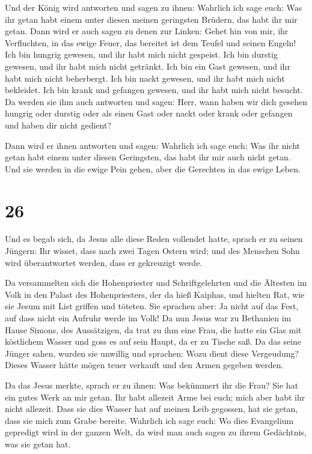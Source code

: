  Und der König wird antworten und sagen zu ihnen:
Wahrlich ich sage euch: Was ihr getan habt einem unter diesen meinen
geringsten Brüdern, das habt ihr mir getan.  Dann wird er
auch sagen zu denen zur Linken: Gehet hin von mir, ihr Verfluchten, in
das ewige Feuer, das bereitet ist dem Teufel und seinen Engeln!
 Ich bin hungrig gewesen, und ihr habt mich nicht
gespeist. Ich bin durstig gewesen, und ihr habt mich nicht getränkt.
 Ich bin ein Gast gewesen, und ihr habt mich nicht
beherbergt. Ich bin nackt gewesen, und ihr habt mich nicht bekleidet.
Ich bin krank und gefangen gewesen, und ihr habt mich nicht besucht.
 Da werden sie ihm auch antworten und sagen: Herr, wann
haben wir dich gesehen hungrig oder durstig oder als einen Gast oder
nackt oder krank oder gefangen und haben dir nicht gedient?

 Dann wird er ihnen antworten und sagen: Wahrlich ich
sage euch: Was ihr nicht getan habt einem unter diesen Geringsten, das
habt ihr mir auch nicht getan.  Und sie werden in die
ewige Pein gehen, aber die Gerechten in das ewige Leben.

\hypertarget{section-25}{%
\section{26}\label{section-25}}

 Und es begab sich, da Jesus alle diese Reden vollendet
hatte, sprach er zu seinen Jüngern:  Ihr wisset, dass nach
zwei Tagen Ostern wird; und des Menschen Sohn wird überantwortet werden,
dass er gekreuzigt werde.

 Da versammelten sich die Hohenpriester und
Schriftgelehrten und die Ältesten im Volk in den Palast des
Hohenpriesters, der da hieß Kaiphas,  und hielten Rat, wie
sie Jesum mit List griffen und töteten.  Sie sprachen
aber: Ja nicht auf das Fest, auf dass nicht ein Aufruhr werde im Volk!
 Da nun Jesus war zu Bethanien im Hause Simons, des
Aussätzigen,  da trat zu ihm eine Frau, die hatte ein Glas
mit köstlichem Wasser und goss es auf sein Haupt, da er zu Tische saß.
 Da das seine Jünger sahen, wurden sie unwillig und
sprachen: Wozu dient diese Vergeudung?  Dieses Wasser
hätte mögen teuer verkauft und den Armen gegeben werden.

 Da das Jesus merkte, sprach er zu ihnen: Was bekümmert
ihr die Frau? Sie hat ein gutes Werk an mir getan.  Ihr
habt allezeit Arme bei euch; mich aber habt ihr nicht allezeit.
 Dass sie dies Wasser hat auf meinen Leib gegossen, hat
sie getan, dass sie mich zum Grabe bereite.  Wahrlich ich
sage euch: Wo dies Evangelium gepredigt wird in der ganzen Welt, da wird
man auch sagen zu ihrem Gedächtnis, was sie getan hat.

